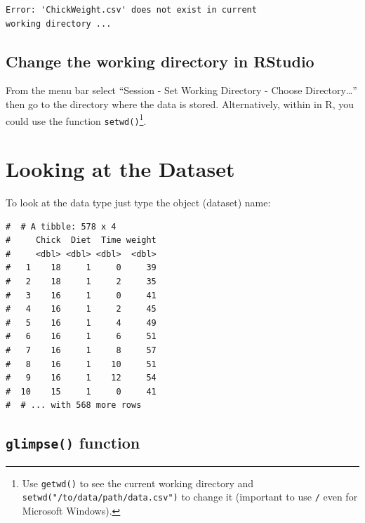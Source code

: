 \documentclass[a4paper,9pt,twocolumn,twoside,printwatermark=false]{pinp}
\begin{document}
\begin{verbatim}
Error: 'ChickWeight.csv' does not exist in current
working directory ...
\end{verbatim}

\subsection{Change the working directory in
RStudio}\label{change-the-working-directory-in-rstudio}

From the menu bar select ``Session - Set Working Directory - Choose
Directory\ldots{}'' then go to the directory where the data is stored.
Alternatively, within in R, you could use the function
\texttt{setwd()}\footnote{Use \texttt{getwd()} to see the current
  working directory and \texttt{setwd("/to/data/path/data.csv")} to
  change it (important to use \texttt{/} even for Microsoft Windows).}.

\section{Looking at the Dataset}\label{looking-at-the-dataset}

To look at the data type just type the object (dataset) name:

\begin{Shaded}
\begin{Highlighting}[]
\end{Highlighting}
\end{Shaded}

\begin{ShadedResult}
\begin{verbatim}
#  # A tibble: 578 x 4
#     Chick  Diet  Time weight
#     <dbl> <dbl> <dbl>  <dbl>
#   1    18     1     0     39
#   2    18     1     2     35
#   3    16     1     0     41
#   4    16     1     2     45
#   5    16     1     4     49
#   6    16     1     6     51
#   7    16     1     8     57
#   8    16     1    10     51
#   9    16     1    12     54
#  10    15     1     0     41
#  # ... with 568 more rows
\end{verbatim}
\end{ShadedResult}

\subsection{\texorpdfstring{\texttt{glimpse()}
function}{glimpse() function}}\label{glimpse-function}
\end{document}
